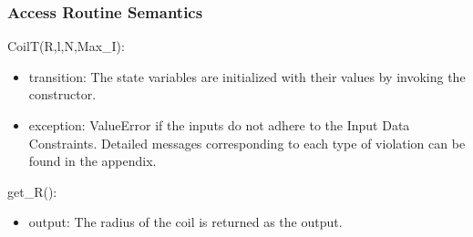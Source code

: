 \documentclass[12pt, titlepage]{article}
\begin{document}
\subsubsection{Access Routine Semantics}

\noindent CoilT(R,l,N,Max\_I):
\begin{itemize}
\item transition: The state variables are initialized with their values by invoking the constructor.
\item exception: ValueError if the inputs do not adhere to the Input Data Constraints. Detailed messages corresponding to each type of violation can be found in the appendix.
\end{itemize}

\noindent get\_R():
\begin{itemize}
\item output: The radius of the coil is returned as the output.
\end{itemize}
\end{document}

